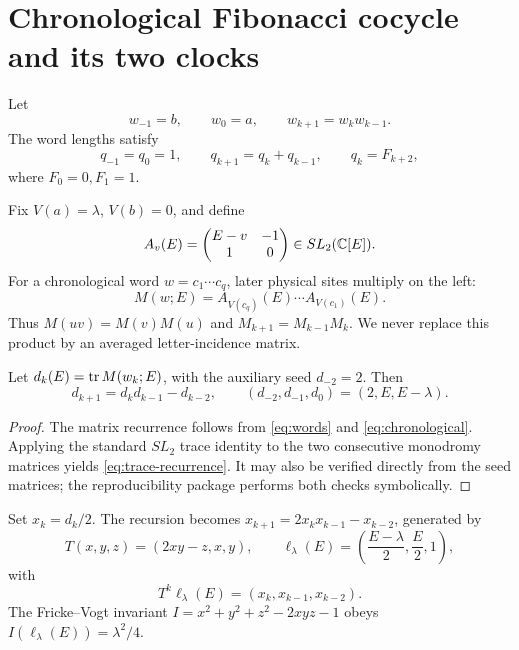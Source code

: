\section{Chronological Fibonacci cocycle and its two clocks}

Let
\begin{equation}
w_{-1}=b,\qquad w_0=a,\qquad w_{k+1}=w_kw_{k-1}.
\label{eq:words}
\end{equation}
The word lengths satisfy
\begin{equation}
q_{-1}=q_0=1,\qquad q_{k+1}=q_k+q_{k-1},
\qquad q_k=F_{k+2},
\label{eq:lengths}
\end{equation}
where \(F_0=0,F_1=1\).

Fix \(V(a)=\lambda\), \(V(b)=0\), and define
\begin{equation}
A_v(E)=
\begin{pmatrix}E-v&-1\\1&0\end{pmatrix}\in SL_2(\mathbb C[E]).
\label{eq:site}
\end{equation}
For a chronological word \(w=c_1\cdots c_q\), later physical sites multiply
on the left:
\begin{equation}
M(w;E)=A_{V(c_q)}(E)\cdots A_{V(c_1)}(E).
\label{eq:chronological}
\end{equation}
Thus \(M(uv)=M(v)M(u)\) and
\(M_{k+1}=M_{k-1}M_k\).  We never replace this product by an averaged
letter-incidence matrix.

\begin{lemma}
Let \(d_k(E)=\operatorname{tr} M(w_k;E)\), with the auxiliary seed \(d_{-2}=2\).  Then
\begin{equation}
d_{k+1}=d_kd_{k-1}-d_{k-2},\qquad
(d_{-2},d_{-1},d_0)=(2,E,E-\lambda).
\label{eq:trace-recurrence}
\end{equation}
\end{lemma}

\begin{proof}
The matrix recurrence follows from \eqref{eq:words} and
\eqref{eq:chronological}.  Applying the standard \(SL_2\) trace identity to
the two consecutive monodromy matrices yields
\eqref{eq:trace-recurrence}.  It may also be verified directly from the seed
matrices; the reproducibility package performs both checks symbolically.
\end{proof}

Set \(x_k=d_k/2\).  The recursion becomes
\(x_{k+1}=2x_kx_{k-1}-x_{k-2}\), generated by
\begin{equation}
T(x,y,z)=(2xy-z,x,y),\qquad
\ell_\lambda(E)=\left(\frac{E-\lambda}{2},\frac E2,1\right),
\label{eq:trace-map-line}
\end{equation}
with
\begin{equation}
T^k\ell_\lambda(E)=(x_k,x_{k-1},x_{k-2}).
\label{eq:iterate-line}
\end{equation}
The Fricke--Vogt invariant
\(I=x^2+y^2+z^2-2xyz-1\) obeys
\(I(\ell_\lambda(E))=\lambda^2/4\).

